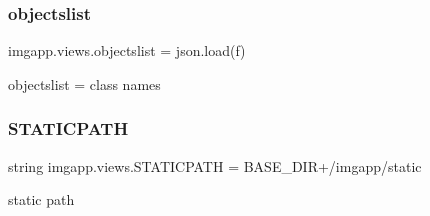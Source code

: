 \subsubsection{\texorpdfstring{objectslist}{objectslist}}
{\footnotesize\ttfamily imgapp.\+views.\+objectslist = json.\+load(f)}



objectslist = class names 

\mbox{\label{namespaceimgapp_1_1views_ae3b2640fa382262bdf30df5509438d83}} 
\subsubsection{\texorpdfstring{S\+T\+A\+T\+I\+C\+P\+A\+TH}{STATICPATH}}
{\footnotesize\ttfamily string imgapp.\+views.\+S\+T\+A\+T\+I\+C\+P\+A\+TH = B\+A\+S\+E\+\_\+\+D\+IR+\textquotesingle{}/imgapp/static\textquotesingle{}}



static path 

